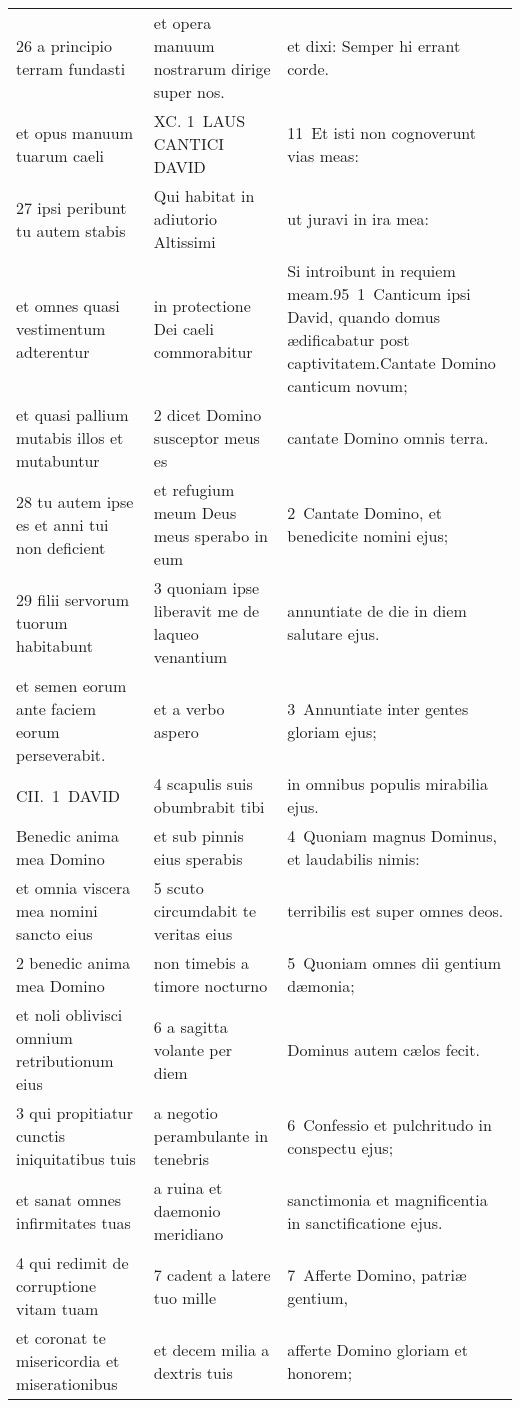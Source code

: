 \documentclass{article}
\begin{document}
\begin{longtable}{@{}p{}p{}p{}@{}}
26 a principio terram fundasti	&	et opera manuum nostrarum dirige super nos.	&	et dixi: Semper hi errant corde.	\\
et opus manuum tuarum caeli	&	XC. 1 LAUS CANTICI DAVID	&	11 Et isti non cognoverunt vias meas:	\\
27 ipsi peribunt tu autem stabis	&	Qui habitat in adiutorio Altissimi	&	ut juravi in ira mea:	\\
et omnes quasi vestimentum adterentur	&	in protectione Dei caeli commorabitur	&	Si introibunt in requiem meam.95 1 Canticum ipsi David, quando domus ædificabatur post captivitatem.Cantate Domino canticum novum;	\\
et quasi pallium mutabis illos et mutabuntur	&	2 dicet Domino susceptor meus es	&	cantate Domino omnis terra.	\\
28 tu autem ipse es et anni tui non deficient	&	et refugium meum Deus meus sperabo in eum	&	2 Cantate Domino, et benedicite nomini ejus;	\\
29 filii servorum tuorum habitabunt	&	3 quoniam ipse liberavit me de laqueo venantium	&	annuntiate de die in diem salutare ejus.	\\
et semen eorum ante faciem eorum perseverabit.	&	et a verbo aspero	&	3 Annuntiate inter gentes gloriam ejus;	\\
CII. 1 DAVID	&	4 scapulis suis obumbrabit tibi	&	in omnibus populis mirabilia ejus.	\\
Benedic anima mea Domino	&	et sub pinnis eius sperabis	&	4 Quoniam magnus Dominus, et laudabilis nimis:	\\
et omnia viscera mea nomini sancto eius	&	5 scuto circumdabit te veritas eius	&	terribilis est super omnes deos.	\\
2 benedic anima mea Domino	&	non timebis a timore nocturno	&	5 Quoniam omnes dii gentium dæmonia;	\\
et noli oblivisci omnium retributionum eius	&	6 a sagitta volante per diem	&	Dominus autem cælos fecit.	\\
3 qui propitiatur cunctis iniquitatibus tuis	&	a negotio perambulante in tenebris	&	6 Confessio et pulchritudo in conspectu ejus;	\\
et sanat omnes infirmitates tuas	&	a ruina et daemonio meridiano	&	sanctimonia et magnificentia in sanctificatione ejus.	\\
4 qui redimit de corruptione vitam tuam	&	7 cadent a latere tuo mille	&	7 Afferte Domino, patriæ gentium,	\\
et coronat te misericordia et miserationibus	&	et decem milia a dextris tuis	&	afferte Domino gloriam et honorem;	\\

\end{longtable}
\end{document}
